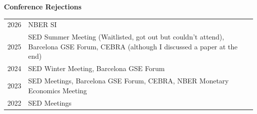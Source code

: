\documentclass[12pt]{article}
\begin{document}
\textbf{Conference Rejections}\\
\begin{tabular}{lp{\dimexpr\textwidth-2cm}}
    2026 & NBER SI\\
    2025 & SED Summer Meeting (Waitlisted, got out but couldn’t attend), Barcelona GSE Forum, CEBRA (although I discussed a paper at the end)\\
    2024 &SED Winter Meeting, Barcelona GSE Forum\\
    2023 &SED Meetings, Barcelona GSE Forum, CEBRA, NBER Monetary Economics Meeting\\ 
    2022 &SED Meetings
    \end{tabular}
\end{document}
